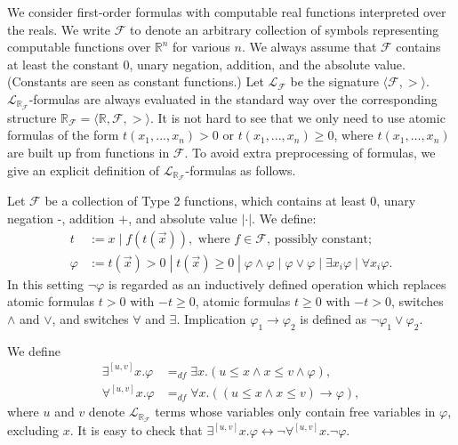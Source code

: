 \documentclass[envcountsect]{llncs}
\newcommand{\lrf}{\mathcal{L}_{\mathbb{R}_{\mathcal{F}}}}
\begin{document}
We consider first-order formulas with computable real functions interpreted 
over the reals. We write $\mathcal{F}$ to denote an arbitrary collection of
symbols representing computable functions over $\mathbb{R}^n$ for various
$n$. We always assume that $\mathcal{F}$ contains at least the constant $0$,
unary negation, addition, and the absolute value. (Constants are seen as
constant functions.) Let $\mathcal{L_{\mathcal{F}}}$ be the signature $\langle
\mathcal{F}, >\rangle$. $\lrf$-formulas are always
evaluated in the standard way over the corresponding structure
$\mathbb{R}_{\mathcal{F}}= \langle \mathbb{R}, \mathcal{F}, >\rangle$.  It is
not hard to see that we only need to use atomic formulas of the form 
$t(x_1,...,x_n)>0$ or $t(x_1,...,x_n)\geq 0$, where $t(x_1,...,x_n)$ are built
up from functions in $\mathcal{F}$. To avoid extra preprocessing of formulas, we
give an explicit definition of $\lrf$-formulas as follows.
\begin{definition}[$\lrf$-Formulas]
Let $\mathcal{F}$ be a collection of Type 2 functions, which contains at least 
$0$, unary negation -, addition $+$, and absolute value $|\cdot|$. We define:
\begin{align*}
t& := x \; | \; f(t(\vec x)), \mbox{ where }f\in \mathcal{F}\mbox{, possibly 
constant};\\
\varphi& := t(\vec x)> 0 \; | \; t(\vec x)\geq 0 \; | \; \varphi\wedge\varphi 
\; | \; \varphi\vee\varphi \; | \; \exists x_i\varphi \; |\; \forall x_i\varphi.
\end{align*}
In this setting $\neg\varphi$ is regarded as an inductively defined operation 
which replaces atomic formulas $t>0$ with $-t\geq 0$, atomic formulas $t\geq 0$
with $-t>0$, switches $\wedge$ and $\vee$, and switches $\forall$ and $\exists$.
Implication $\varphi_1\rightarrow\varphi_2$ is defined as
$\neg\varphi_1\vee\varphi_2$.
\end{definition}
\begin{definition}
We define
\begin{align*}
\exists^{[u,v]}x.\varphi &=_{df}\exists x. ( u \leq x \land x \leq v \wedge 
\varphi),\\
\forall^{[u,v]}x.\varphi &=_{df} \forall x. ( (u \leq x \land x \leq v) 
\rightarrow \varphi),
\end{align*}
where $u$ and $v$ denote $\lrf$ terms whose variables only
contain free variables in $\varphi$, excluding $x$. It is easy to check that
$\exists^{[u,v]}x. \varphi \leftrightarrow \neg \forall^{[u,v]}x. \neg\varphi$. 
\end{definition}
\end{document}
